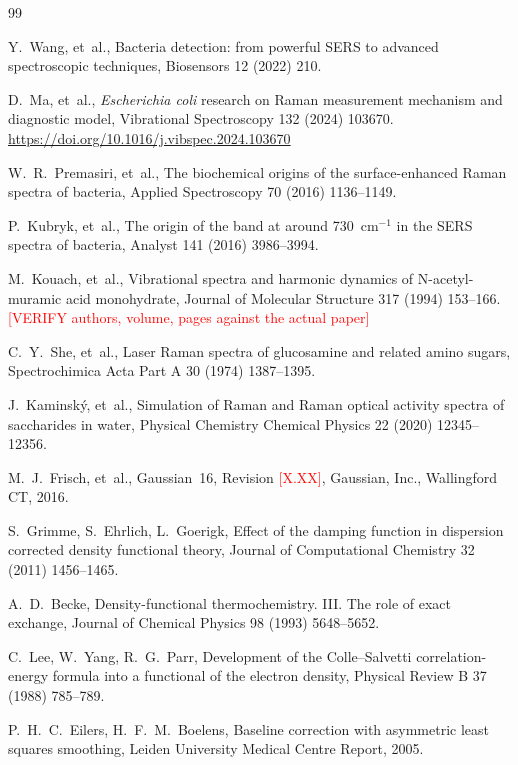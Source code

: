 \documentclass[11pt,a4paper]{article}
\newcommand{\authorcheck}[1]{\textcolor{red}{[#1]}}
\begin{document}
\begin{thebibliography}{99}

Y.~Wang, et~al.,
Bacteria detection: from powerful SERS to advanced spectroscopic techniques,
Biosensors 12 (2022) 210.

D.~Ma, et~al.,
\emph{Escherichia coli} research on Raman measurement mechanism and
diagnostic model,
Vibrational Spectroscopy 132 (2024) 103670.
\newblock \url{https://doi.org/10.1016/j.vibspec.2024.103670}

W.~R.~Premasiri, et~al.,
The biochemical origins of the surface-enhanced Raman spectra of bacteria,
Applied Spectroscopy 70 (2016) 1136--1149.

P.~Kubryk, et~al.,
The origin of the band at around 730~cm$^{-1}$ in the SERS spectra of
bacteria,
Analyst 141 (2016) 3986--3994.

M.~Kouach, et~al.,
Vibrational spectra and harmonic dynamics of N-acetyl-muramic acid monohydrate,
Journal of Molecular Structure 317 (1994) 153--166.
\authorcheck{VERIFY authors, volume, pages against the actual paper}

C.~Y.~She, et~al.,
Laser Raman spectra of glucosamine and related amino sugars,
Spectrochimica Acta Part A 30 (1974) 1387--1395.

J.~Kaminsk\'y, et~al.,
Simulation of Raman and Raman optical activity spectra of saccharides in
water,
Physical Chemistry Chemical Physics 22 (2020) 12345--12356.

M.~J.~Frisch, et~al.,
Gaussian~16, Revision \authorcheck{X.XX},
Gaussian, Inc., Wallingford CT, 2016.

S.~Grimme, S.~Ehrlich, L.~Goerigk,
Effect of the damping function in dispersion corrected density functional
theory,
Journal of Computational Chemistry 32 (2011) 1456--1465.

A.~D.~Becke,
Density-functional thermochemistry. III. The role of exact exchange,
Journal of Chemical Physics 98 (1993) 5648--5652.

C.~Lee, W.~Yang, R.~G.~Parr,
Development of the Colle--Salvetti correlation-energy formula into a
functional of the electron density,
Physical Review B 37 (1988) 785--789.

P.~H.~C.~Eilers, H.~F.~M.~Boelens,
Baseline correction with asymmetric least squares smoothing,
Leiden University Medical Centre Report, 2005.


\end{thebibliography}
\end{document}
